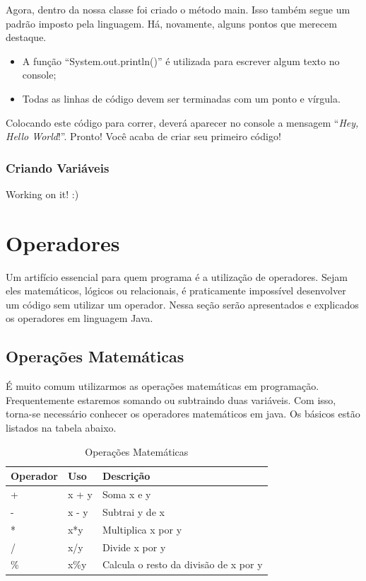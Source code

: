 \documentclass[
]{book}
\providecommand{\tightlist}{%
  \setlength{\itemsep}{0pt}\setlength{\parskip}{0pt}}
\begin{document}
Agora, dentro da nossa classe foi criado o método main. Isso também segue um padrão imposto pela linguagem. Há, novamente, alguns pontos que merecem destaque.

\begin{itemize}
\tightlist
\item
  A função ``System.out.println()'' é utilizada para escrever algum texto no console;
\item
  Todas as linhas de código devem ser terminadas com um ponto e vírgula.
\end{itemize}

Colocando este código para correr, deverá aparecer no console a mensagem ``\emph{Hey, Hello World}!''. Pronto! Você acaba de criar seu primeiro código!

\hypertarget{criando-variuxe1veis}{%
\subsection{Criando Variáveis}\label{criando-variuxe1veis}}

Working on it! :)

\hypertarget{operadores}{%
\chapter{Operadores}\label{operadores}}

Um artifício essencial para quem programa é a utilização de operadores. Sejam eles matemáticos, lógicos ou relacionais, é praticamente impossível desenvolver um código sem utilizar um operador. Nessa seção serão apresentados e explicados os operadores em linguagem Java.

\hypertarget{operauxe7uxf5es-matemuxe1ticas}{%
\section{Operações Matemáticas}\label{operauxe7uxf5es-matemuxe1ticas}}

É muito comum utilizarmos as operações matemáticas em programação. Frequentemente estaremos somando ou subtraindo duas variáveis. Com isso, torna-se necessário conhecer os operadores matemáticos em java. Os básicos estão listados na tabela abaixo.

\begin{table}

\caption{\label{tab:unnamed-chunk-4}Operações Matemáticas}
\centering
\begin{tabular}[t]{l|l|l}
\hline
Operador & Uso & Descrição\\
\hline
+ & x + y & Soma x e y\\
\hline
- & x - y & Subtrai y de x\\
\hline
* & x*y & Multiplica x por y\\
\hline
/ & x/y & Divide x por y\\
\hline
\% & x\%y & Calcula o resto da divisão de x por y\\
\hline
\end{tabular}
\end{table}
\end{document}
